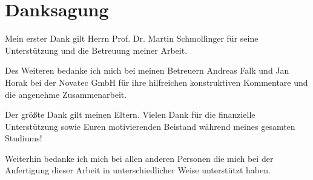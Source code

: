 \chapter{\textbf{Danksagung}} 	%

Mein erster Dank gilt Herrn Prof. Dr. Martin Schmollinger für seine Unterstützung
und die Betreuung meiner Arbeit.

Des Weiteren bedanke ich mich bei meinen Betreuern Andreas Falk und Jan Horak bei der Novatec GmbH für ihre hilfreichen konstruktiven Kommentare und die angenehme Zusammenarbeit.

Der größte Dank gilt meinen Eltern. Vielen Dank für die finanzielle Unterstützung sowie Euren motivierenden Beistand während meines gesamten Studiums!

Weiterhin bedanke ich mich bei allen anderen Personen die mich bei der Anfertigung
dieser Arbeit in unterschiedlicher Weise unterstützt haben.




